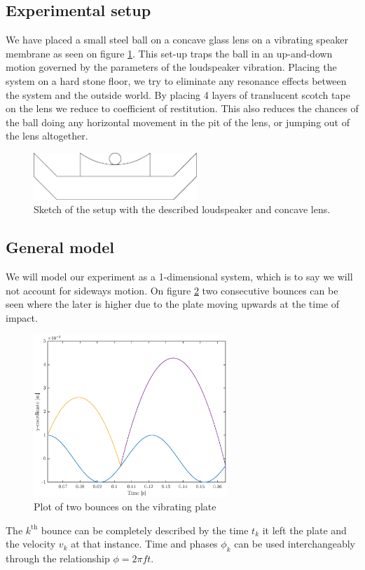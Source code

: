 \documentclass[12pt,oneside,a4paper]{article}
\numberwithin{equation}{section}
\begin{document}
{{{{\subsection{Experimental setup}
We have placed a small steel ball on a concave glass lens on a vibrating speaker membrane as seen on figure \ref{sketch}. This set-up traps the ball in an up-and-down motion governed by the parameters of the loudspeaker vibration. Placing the system on a hard stone floor, we try to eliminate any resonance effects between the system and the outside world. By placing 4 layers of translucent scotch tape on the lens we 
reduce to coefficient of restitution. This also reduces the chances of the ball doing any horizontal movement in the pit of the lens, or jumping out of the lens altogether. 
\begin{figure}[h]
	\centering
	\includegraphics[width=0.55\textwidth]{speaker}
	\caption{Sketch of the setup with the described loudspeaker and concave lens.}
	\label{sketch}
\end{figure}
\subsection{General model}
We will model our experiment as a 1-dimensional system, which is to say we will not 
account for sideways motion. On figure \ref{bounces} two consecutive bounces 
can be seen where the later is higher due to the plate  moving upwards at the 
time of impact.
\begin{figure}[h]
	\centering
	\includegraphics[width=0.65\textwidth]{Figures/bounceplot.eps}
	\caption{Plot of two bounces on the vibrating plate}
	\label{bounces}
\end{figure}
The $k^{\text{th}}$ bounce can be completely described by the time $t_k$ it left the plate and the velocity $v_k$ at that instance. Time and phases $\phi_k$ can be used interchangeably through the relationship $\phi=2\pi f t$.

}}}}
\end{document}
